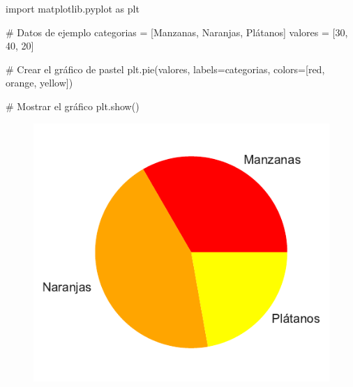 \documentclass[
  a4paper,
]{article}
\newenvironment{Shaded}{}{}
\newcommand{\CommentTok}[1]{\textcolor[rgb]{0.42,0.45,0.49}{#1}}
\newcommand{\DecValTok}[1]{\textcolor[rgb]{0.00,0.36,0.77}{#1}}
\newcommand{\ImportTok}[1]{\textcolor[rgb]{0.01,0.18,0.38}{#1}}
\newcommand{\NormalTok}[1]{\textcolor[rgb]{0.14,0.16,0.18}{#1}}
\newcommand{\OperatorTok}[1]{\textcolor[rgb]{0.14,0.16,0.18}{#1}}
\newcommand{\StringTok}[1]{\textcolor[rgb]{0.01,0.18,0.38}{#1}}
\begin{document}
\begin{Shaded}
\begin{Highlighting}[]
\ImportTok{import}\NormalTok{ matplotlib.pyplot }\ImportTok{as}\NormalTok{ plt}

\CommentTok{\# Datos de ejemplo}
\NormalTok{categorias }\OperatorTok{=}\NormalTok{ [}\StringTok{\textquotesingle{}Manzanas\textquotesingle{}}\NormalTok{, }\StringTok{\textquotesingle{}Naranjas\textquotesingle{}}\NormalTok{, }\StringTok{\textquotesingle{}Plátanos\textquotesingle{}}\NormalTok{]}
\NormalTok{valores }\OperatorTok{=}\NormalTok{ [}\DecValTok{30}\NormalTok{, }\DecValTok{40}\NormalTok{, }\DecValTok{20}\NormalTok{]}

\CommentTok{\# Crear el gráfico de pastel}
\NormalTok{plt.pie(valores, labels}\OperatorTok{=}\NormalTok{categorias, colors}\OperatorTok{=}\NormalTok{[}\StringTok{\textquotesingle{}red\textquotesingle{}}\NormalTok{, }\StringTok{\textquotesingle{}orange\textquotesingle{}}\NormalTok{, }\StringTok{\textquotesingle{}yellow\textquotesingle{}}\NormalTok{])}

\CommentTok{\# Mostrar el gráfico}
\NormalTok{plt.show()}
\end{Highlighting}
\end{Shaded}

\begin{figure}[H]

{\centering \includegraphics{index_files/figure-pdf/cell-6-output-1.pdf}

}

\end{figure}
\end{document}
